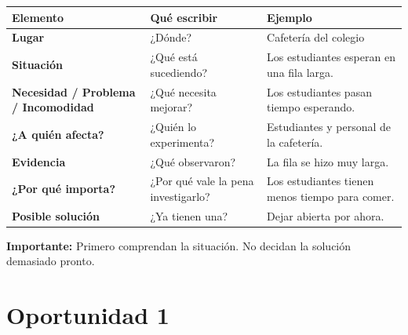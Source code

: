 \documentclass[12pt,a4paper]{article}
\begin{document}
	\begin{center}
		\small
		\begin{tabular}{|L{0.20\textwidth}|L{0.26\textwidth}|L{0.38\textwidth}|}
			\hline
			\textbf{Elemento} & \textbf{Qué escribir} & \textbf{Ejemplo} \\
			\hline
			\textbf{Lugar} & ¿Dónde? & Cafetería del colegio \\
			\hline
			\textbf{Situación} & ¿Qué está sucediendo? & Los estudiantes esperan en una fila larga. \\
			\hline
			\textbf{Necesidad / Problema / Incomodidad} & ¿Qué necesita mejorar? & Los estudiantes pasan tiempo esperando. \\
			\hline
			\textbf{¿A quién afecta?} & ¿Quién lo experimenta? & Estudiantes y personal de la cafetería. \\
			\hline
			\textbf{Evidencia} & ¿Qué observaron? & La fila se hizo muy larga. \\
			\hline
			\textbf{¿Por qué importa?} & ¿Por qué vale la pena investigarlo? & Los estudiantes tienen menos tiempo para comer. \\
			\hline
			\textbf{Posible solución} & ¿Ya tienen una? & Dejar abierta por ahora. \\
			\hline
		\end{tabular}
	\end{center}
	
	\textbf{Importante:} Primero comprendan la situación. No decidan la solución demasiado pronto.
	
	\section*{Oportunidad 1}
	
\end{document}
